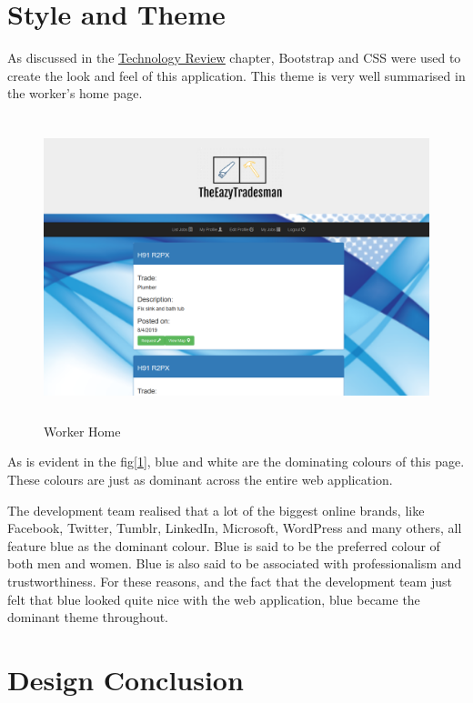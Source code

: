 \section{Style and Theme}
\label{sec:SystemDesignStyleandTheme}
As discussed in the  \hyperref[sec:TechnologyReview]{\underline{Technology Review}} chapter, Bootstrap and CSS were used to create the look and feel of this application. This theme is very well summarised in the worker's home page.

\begin{figure}[H]
    \centering
    \includegraphics[width=\textwidth, height=250pt]{img/HomeWorker.PNG}
    \caption{Worker Home}
    \label{fig:worker_home}
\end{figure}

As is evident in the fig[\ref{fig:worker_home}], blue and white are the dominating colours of this page. These colours are just as dominant across the entire web application.

The development team realised that a lot of the biggest online brands, like Facebook, Twitter, Tumblr, LinkedIn, Microsoft, WordPress and many others, all feature blue as the dominant colour. Blue is said to be the preferred colour of both men and women. Blue is also said to be associated with professionalism and trustworthiness\cite{Blue}. For these reasons, and the fact that the development team just felt that blue looked quite nice with the web application, blue became the dominant theme throughout. 

\section{Design Conclusion}
\label{sec:SystemDesignConclusion}

